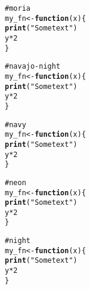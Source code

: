 \documentclass[12pt]{article}\usepackage{graphicx, color}
\makeatletter
\newcommand{\hlfunctioncall}[1]{\textcolor[rgb]{0.188235294117647,0.650980392156863,0.188235294117647}{\textbf{#1}}}%
\newcommand{\hlstring}[1]{\textcolor[rgb]{0.850980392156863,1,0.466666666666667}{#1}}%
\newcommand{\hlcomment}[1]{\textcolor[rgb]{0.533333333333333,0.533333333333333,0.533333333333333}{#1}}%
\newenvironment{kframe}{%
 \def\at@end@of@kframe{}%
 \ifinner\ifhmode%
  \def\at@end@of@kframe{\end{minipage}}%
  \begin{minipage}{\columnwidth}%
 \fi\fi%
 \def\FrameCommand##1{\hskip\@totalleftmargin \hskip-\fboxsep
 \colorbox{shadecolor}{##1}\hskip-\fboxsep
     \hskip-\linewidth \hskip-\@totalleftmargin \hskip\columnwidth}%
 \MakeFramed {\advance\hsize-\width
   \@totalleftmargin\z@ \linewidth\hsize
   \@setminipage}}%
 {\par\unskip\endMakeFramed%
 \at@end@of@kframe}
\newenvironment{knitrout}{}{} %
\makeatother
\begin{document}
\begin{knitrout}
\color{fgcolor}\begin{kframe}
\begin{alltt}
\hlcomment{# moria}
my_fn <- \hlfunctioncall{function}(x) \{
    \hlfunctioncall{print}(\hlstring{"Some text"})
    y * 2
\}
\end{alltt}
\end{kframe}
\end{knitrout}





\begin{knitrout}
\color{fgcolor}\begin{kframe}
\begin{alltt}
\hlcomment{# navajo-night}
my_fn <- \hlfunctioncall{function}(x) \{
    \hlfunctioncall{print}(\hlstring{"Some text"})
    y * 2
\}
\end{alltt}
\end{kframe}
\end{knitrout}





\begin{knitrout}
\color{fgcolor}\begin{kframe}
\begin{alltt}
\hlcomment{# navy}
my_fn <- \hlfunctioncall{function}(x) \{
    \hlfunctioncall{print}(\hlstring{"Some text"})
    y * 2
\}
\end{alltt}
\end{kframe}
\end{knitrout}





\begin{knitrout}
\color{fgcolor}\begin{kframe}
\begin{alltt}
\hlcomment{# neon}
my_fn <- \hlfunctioncall{function}(x) \{
    \hlfunctioncall{print}(\hlstring{"Some text"})
    y * 2
\}
\end{alltt}
\end{kframe}
\end{knitrout}





\begin{knitrout}
\color{fgcolor}\begin{kframe}
\begin{alltt}
\hlcomment{# night}
my_fn <- \hlfunctioncall{function}(x) \{
    \hlfunctioncall{print}(\hlstring{"Some text"})
    y * 2
\}
\end{alltt}
\end{kframe}
\end{knitrout}
\end{document}
